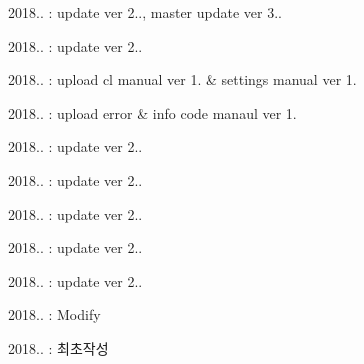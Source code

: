 \begin{DoxyItemize}
\item 2018.. \-: update ver 2.., master update ver 3..
\item 2018.. \-: update ver 2..
\item 2018.. \-: upload cl manual ver 1. \& settings manual ver 1.
\item 2018.. \-: upload error \& info code manaul ver 1.
\item 2018.. \-: update ver 2..
\item 2018.. \-: update ver 2..
\item 2018.. \-: update ver 2..
\item 2018.. \-: update ver 2..
\item 2018.. \-: update ver 2..
\item 2018.. \-: Modify
\item 2018.. \-: 최초작성 
\end{DoxyItemize}